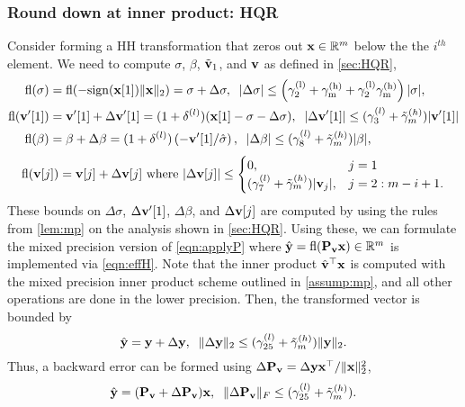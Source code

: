\subsubsection{Round down at inner product: HQR}
Consider forming a HH transformation that zeros out $\mathbf{x}\in\mathbb{R}^m$ below the the $i^{th}$ element. 
We need to compute $\sigma$, $\beta$, $\tilde{\mathbf{v}}_1$, and $\mathbf{v}$ as defined in \cref{sec:HQR},
\begin{align}
\fl(\sigma) &= \fl(-\rm{sign}(\bb{x}[1])\|\bb{x}\|_2) = \sigma + \Delta \sigma,\;\;|\Delta\sigma| \leq \left(\gamma_{2}^{(l)}+\gamma_{m}^{(h)}+\gamma_{2}^{(l)}\gamma_{m}^{(h)}\right)|\sigma|,\label{eqn:mpsigma}\\
\fl(\bb{v}'[1])& =\bb{v}'[1] + \Delta \bb{v}'[1] = (1+\dd^{(l)}) (\bb{x}[1]-\sigma-\Delta\sigma), \;\;|\Delta\bb{v}'[1]| \leq (\gamma_{3}^{(l)}+\tilde{\gamma}_{m}^{(h)})|\bb{v}'[1]| \label{eqn:mpv1}\\
\fl(\beta) &= \beta +\Delta \beta= (1+\dd^{(l)})\left(-\bb{v}'[1]/\hat{\sigma}\right), \;\; |\Delta\beta| \leq (\gamma_{8}^{(l)}+\tilde{\gamma}_{m}^{(h)})|\beta|, \label{eqn:mpbeta}
\end{align}
\begin{equation}
	\fl(\bb{v}[j])	= \bb{v}[j] + \Delta \bb{v}[j]\text{ where }|\Delta \bb{v}[j]|\leq 
	\begin{cases}
	0,& j=1\\
	(\gamma_{7}^{(l)} + \tilde{\gamma}_{m}^{(h)})|\bb{v}_j|,&j=2:m-i+1.
	\end{cases}  \label{eqn:mpv}
\end{equation}
These bounds on $\Delta\sigma$, $\Delta \mathbf{v}'[1]$, $\Delta \beta$, and $\Delta \mathbf{v}[j]$ are computed by using the rules from \cref{lem:mp} on the analysis shown in \cref{sec:HQR}.
Using these, we can formulate the mixed precision version of \cref{eqn:applyP} where $\hat{\mathbf{y}}=\mathrm{fl}(\mathbf{P_vx})\in\mathbb{R}^m$ is implemented via \cref{eqn:effH}.
Note that the inner product $\hat{\mathbf{v}}^{\top}\mathbf{x}$ is computed with the mixed precision inner product scheme outlined in \cref{assump:mp}, and all other operations are done in the lower precision.
Then, the transformed vector is bounded by
\begin{equation}
	\hat{\bb{y}} = \bb{y}+\Delta \bb{y},\;\; \|\Delta \bb{y}\|_2 \leq (\gamma_{25}^{(l)} + \tilde{\gamma}_{m}^{(h)})\|\bb{y}\|_2.\label{eqn:mpdelty}
\end{equation}
Thus, a backward error can be formed using $\Delta \mathbf{P_v} = \Delta \mathbf{y}\mathbf{x}^{
\top}/\|\mathbf{x}\|_2^2$,
\begin{equation}
	\hat{\bb{y}} = (\bb{P_v} + \Delta \bb{P_v})\bb{x},\;\; \|\Delta \bb{P_v}\|_F\leq (\gamma_{25}^{(l)} + \tilde{\gamma}_{m}^{(h)}). \label{eqn:mpapplyP}
\end{equation}
